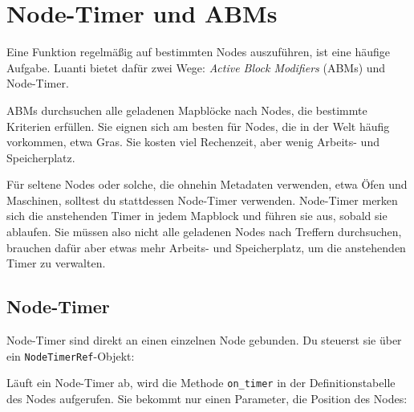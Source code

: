 \chapter{Node-Timer und ABMs}
\label{ch:map/timers}

Eine Funktion regelmäßig auf bestimmten Nodes auszuführen, ist eine
häufige Aufgabe. Luanti bietet dafür zwei Wege: \emph{Active Block
Modifiers} (ABMs) und
Node-Timer.

ABMs durchsuchen alle geladenen Mapblöcke nach Nodes, die bestimmte
Kriterien erfüllen. Sie eignen sich am besten für Nodes, die in der Welt
häufig vorkommen, etwa Gras. Sie kosten viel Rechenzeit, aber wenig
Arbeits- und Speicherplatz.

Für seltene Nodes oder solche, die ohnehin
Metadaten verwenden, etwa Öfen und Maschinen,
solltest du stattdessen Node-Timer verwenden. Node-Timer merken sich die
anstehenden Timer in jedem Mapblock und führen
sie aus, sobald sie ablaufen. Sie müssen also nicht alle geladenen Nodes
nach Treffern durchsuchen, brauchen dafür aber etwas mehr Arbeits- und
Speicherplatz, um die anstehenden Timer zu verwalten.

\section{Node-Timer}\label{node-timer}

Node-Timer sind direkt an einen einzelnen Node gebunden. Du steuerst sie
über ein \texttt{NodeTimerRef}-Objekt:

\begin{Shaded}
\begin{Highlighting}[]
  \OperatorTok{=} \OperatorTok{(}\OperatorTok{)}
\OperatorTok{:}\OperatorTok{(}\OperatorTok{)} 
\end{Highlighting}
\end{Shaded}

Läuft ein Node-Timer ab, wird die Methode
\texttt{on\_\allowbreak{}timer}
in der Definitionstabelle des Nodes aufgerufen. Sie bekommt nur einen
Parameter, die Position des Nodes:

\begin{Shaded}
\begin{Highlighting}[]
\OperatorTok{(}\OperatorTok{,} \OperatorTok{\{}
     \OperatorTok{=} \OperatorTok{(}\OperatorTok{)}
        \OperatorTok{(}\OperatorTok{,} \OperatorTok{\{}  \OperatorTok{=}  \OperatorTok{\})}
         
    \OperatorTok{,}
\OperatorTok{\})}
\end{Highlighting}
\end{Shaded}

